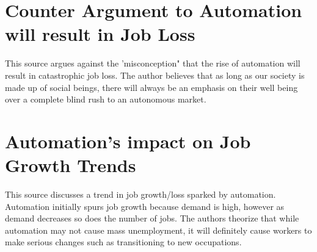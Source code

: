 \documentclass{article}
\begin{document}
\section{Counter Argument to Automation will result in Job Loss}
This source argues against the 'misconception" that the rise of automation will result in catastrophic job loss. The author believes that as long as our society is made up of social beings, there will always be an emphasis on their well being over a complete blind rush to an autonomous market. \cite{2832185620170301}

\section{Automation's impact on Job Growth Trends}
This source discusses a trend in job growth/loss sparked by automation. Automation initially spurs job growth because demand is high, however as demand decreases so does the number of jobs. The authors theorize that while automation may not cause mass unemployment, it will definitely cause workers to make serious changes such as transitioning to new occupations. \cite{14450544920191001}



\end{document}
